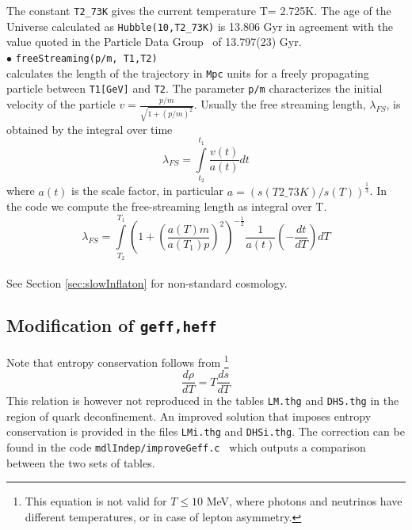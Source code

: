 \documentclass[12pt,a4paper]{article}
\begin{document}
The constant \verb|T2_73K| gives  the  current temperature T= 2.725K. The age of the Universe  calculated as
\verb|Hubble(10,T2_73K)| is 13.806  Gyr in agreement with the value quoted in the Particle Data Group~\cite{Nakamura:2010zzi}
of 13.797(23) Gyr. 
%
\\
\noindent$\bullet$ \verb|freeStreaming(p/m, T1,T2)|\\
calculates  the length of the  trajectory in {\tt Mpc} units  for a freely propagating particle between 
{\tt T1[GeV]} and  {\tt T2}. The parameter {\tt p/m} 
characterizes the initial velocity of the particle $v=\frac{p/m}{\sqrt{ 1+ (p/m)^2}}$.
Usually the free streaming length, $\lambda_{FS}$,  is obtained by the integral over time 
\begin{equation}
 \lambda_{FS}=   \int \limits_{t_2}^{t_1}  \frac{v(t)}{ a(t)}dt 
 \end{equation}
 where $a(t)$ is the scale factor, in particular  $ a = \left( s(T2\_73K)/s(T)\right)^{\frac{1}{3}}$. In the code we compute the free-streaming length
as integral over T.
\begin{equation}
 \lambda_{FS}=  \int
\limits_{T_2}^{T_1}  \left( 1+ \left(\frac{
a(T)m}{ a(T_1)p}\right)^2\right)^{-\frac{1}{2}} \frac{1}{a(t)} \left(-\frac{dt}{dT} \right) dT
\end{equation}  
\\  
%
See Section \ref{sec:slowInflaton} for non-standard cosmology.

\subsection{Modification of {\tt geff,heff}}

 
Note that entropy conservation follows from \footnote{ This
equation is not valid for $T\le 10$ MeV, where photons and neutrinos have
different temperatures, or  in case of lepton asymmetry.} 
\begin{equation}
    \frac{d\rho}{dT} = T\frac{d s}{dT}  
\end{equation}
This relation is however not  reproduced in the tables {\tt LM.thg} and {\tt DHS.thg} in the region of quark deconfinement. An improved solution that imposes entropy conservation is
provided  in the files {\tt LMi.thg} and {\tt DHSi.thg}. The correction can be found in  the code {\tt mdlIndep/improveGeff.c } which outputs a comparison between the two sets of tables. 
\end{document}
